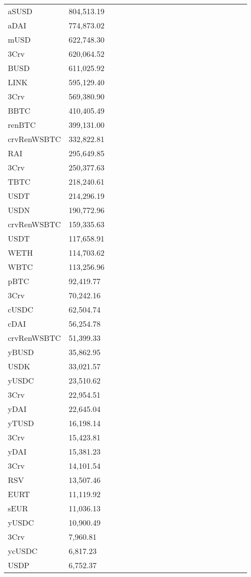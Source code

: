 \begin{longtable}{@{}p{0.25\linewidth}p{0.25\linewidth}p{0.25\linewidth}p{0.25\linewidth}@{}}
aSUSD & 804,513.19 & & \\
aDAI & 774,873.02 & & \\
mUSD & 622,748.30 & & \\
3Crv & 620,064.52 & & \\
BUSD & 611,025.92 & & \\
LINK & 595,129.40 & & \\
3Crv & 569,380.90 & & \\
BBTC & 410,405.49 & & \\
renBTC & 399,131.00 & & \\
crvRenWSBTC & 332,822.81 & & \\
RAI & 295,649.85 & & \\
3Crv & 250,377.63 & & \\
TBTC & 218,240.61 & & \\
USDT & 214,296.19 & & \\
USDN & 190,772.96 & & \\
crvRenWSBTC & 159,335.63 & & \\
USDT & 117,658.91 & & \\
WETH & 114,703.62 & & \\
WBTC & 113,256.96 & & \\
pBTC & 92,419.77 & & \\
3Crv & 70,242.16 & & \\
cUSDC & 62,504.74 & & \\
cDAI & 56,254.78 & & \\
crvRenWSBTC & 51,399.33 & & \\
yBUSD & 35,862.95 & & \\
USDK & 33,021.57 & & \\
yUSDC & 23,510.62 & & \\
3Crv & 22,954.51 & & \\
yDAI & 22,645.04 & & \\
yTUSD & 16,198.14 & & \\
3Crv & 15,423.81 & & \\
yDAI & 15,381.23 & & \\
3Crv & 14,101.54 & & \\
RSV & 13,507.46 & & \\
EURT & 11,119.92 & & \\
sEUR & 11,036.13 & & \\
yUSDC & 10,900.49 & & \\
3Crv & 7,960.81 & & \\
ycUSDC & 6,817.23 & & \\
USDP & 6,752.37 & & \\

\end{longtable}
